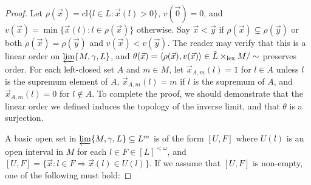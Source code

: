 \documentclass[11pt]{article}
\renewcommand{\cl}{\textrm{cl}}
\newcommand{\lexTimes}{\times_{\textrm{lex}}}
\newcommand{\vect}{\vec}
\begin{document}
  \begin{proof}
    Let \(\rho(\vect x)=\cl\{l\in L:\vect x(l)>0\}\), \(v(\vect 0)=0\),
    and \(v(\vect x)=\min\{\vect x(l):l\in\rho(\vect x)\}\) otherwise.
    Say \(\vect x<\vect y\) if \(\rho(\vect x)\subsetneq\rho(\vect y)\)
    or both \(\rho(\vect x)=\rho(\vect y)\) and \(v(\vect x)<v(\vect y)\).
    The reader may verify that this is a linear order on
    \(\varprojlim\{M,\gamma,L\}\), and
    \(\theta(\vect x)=\<\rho(\vect x),v(\vect x)\>\in\hat L\lexTimes M/\sim\)
    preserves order.
    For each left-closed set \(A\) and \(m\in M\),
    let \(\vect x_{A,m}(l)=1\) for \(l\in A\) unless \(l\) is the supremum
    element of \(A\),
    \(\vect x_{A,m}(l)=m\) if \(l\) is the supremum of \(A\),
    and \(\vect x_{A,m}(l)=0\) for \(l\not\in A\).
    To complete the proof, we should demonstrate that the linear order we
    defined induces the topology of the inverse limit, and that \(\theta\)
    is a surjection.

    A basic open set in \(\varprojlim\{M,\gamma,L\}\subseteq L^m\)
    is of the form
    \([U,F]\) where \(U(l)\) is an open interval in \(M\) for each
    \(l\in F\in [L]^{<\omega}\), and
    \([U,F]=\{\vect x:l\in F\Rightarrow\vect x(l)\in U(l)\}\).
    If we assume that \([U,F]\) is non-empty, one of the following
    must hold:


\end{proof}
\end{document}

